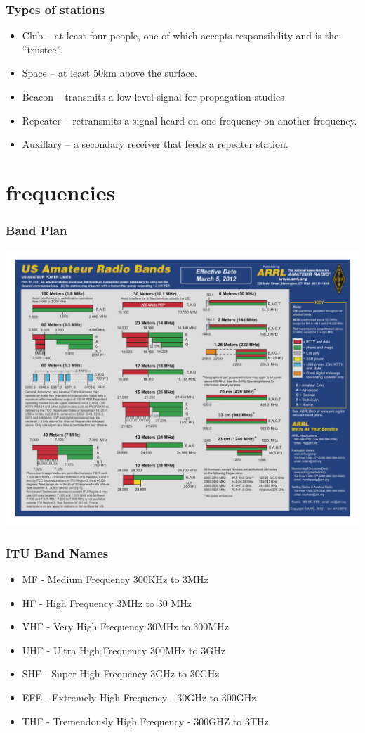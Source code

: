 \documentclass[10pt]{beamer}
\begin{document}
\begin{frame}
\frametitle{Types of stations}
\begin{itemize}
\item Club – at least four  people, one of which accepts responsibility and is the “trustee”.
\item Space – at least 50km above the surface.
\item Beacon --  transmits a low-level signal for propagation studies
\item Repeater – retransmits  a signal heard on one frequency on another frequency.
\item Auxillary – a secondary receiver that feeds a repeater station.  
\end{itemize}
\end{frame}

\section{frequencies}

\begin{frame}
\frametitle{Band Plan}
\begin{center}
\includegraphics[height=.9\textheight]{hambandscolor.pdf}
\end{center}
\end{frame}

\begin{frame}
\frametitle{ITU Band Names}
\begin{itemize}
\item MF - Medium Frequency 300KHz to 3MHz
\item HF - High Frequency 3MHz to 30 MHz
\item VHF - Very High Frequency 30MHz to 300MHz
\item UHF - Ultra High Frequency 300MHz to 3GHz
\item SHF - Super High Frequency 3GHz to 30GHz
\item EFE - Extremely High Frequency - 30GHz to 300GHz
\item THF - Tremendously High Frequency - 300GHZ to 3THz
\end{itemize}
\end{frame}
\end{document}
